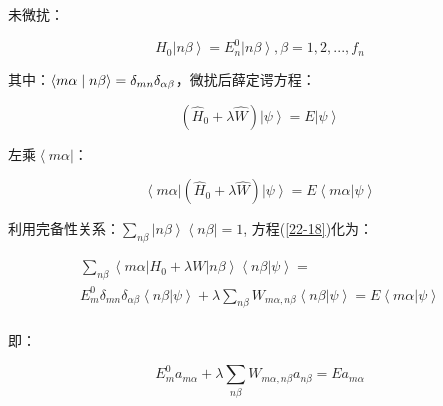 
未微扰：

\begin{equation}\label{22-16}
H_0 \left| {n\beta } \right\rangle  = E_n^0 \left| {n\beta } \right\rangle , \beta  = 1,2,...,f_n
\end{equation}

其中：$\left\langle {{m\alpha }}
 \mathrel{\left | {\vphantom {{m\alpha } {n\beta }}}
 \right. \kern-\nulldelimiterspace}
 {{n\beta }} \right\rangle  = \delta _{mn} \delta _{\alpha \beta } $，微扰后薛定谔方程：

\begin{equation}\label{22-17}
\left( {\hat H_0  + \lambda \hat W} \right)\left| \psi  \right\rangle  = E\left| \psi  \right\rangle
\end{equation}

左乘$\left\langle {m\alpha } \right|$：

\begin{equation}\label{22-18}
\left\langle {m\alpha } \right|\left( {\hat H_0  + \lambda \hat W} \right)\left| \psi  \right\rangle  = E\left\langle {m\alpha } \right.\left| \psi  \right\rangle
\end{equation}

利用完备性关系：$\sum\limits_{n\beta } {\left| {n\beta } \right\rangle \left\langle {n\beta } \right|}  = 1$, 方程(\ref{22-18})化为：

\begin{equation}\label{22-19}
\begin{array}{c}
\sum\limits_{n\beta } {\left\langle {m\alpha } \right|} H_0  + \lambda W\left| {n\beta } \right\rangle \left\langle {n\beta } \right|\left. \psi  \right\rangle  = \\
E_m^0 \delta _{mn} \delta _{\alpha \beta } \left\langle {n\beta } \right|\left. \psi  \right\rangle  + \lambda \sum\limits_{n\beta } {W_{m\alpha ,n\beta } \left\langle {n\beta } \right|\left. \psi  \right\rangle }  = E\left\langle {m\alpha } \right.\left| \psi  \right\rangle \\
\end{array}
\end{equation}

即：

\begin{equation}\label{22-20}
E_m^0 a_{m\alpha }  + \lambda \sum\limits_{n\beta } {W_{m\alpha ,n\beta } a_{n\beta } }  = Ea_{m\alpha }
\end{equation}


